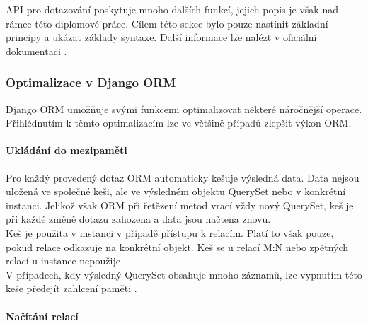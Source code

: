 \documentclass[ing,male,java,dept456]{diploma}						%
\begin{document}
API pro dotazování poskytuje mnoho dalších funkcí, jejich popis je však nad rámec této diplomové práce. Cílem této sekce bylo pouze nastínit základní principy a ukázat základy syntaxe. Další informace lze nalézt v oficiální dokumentaci \cite{djangodoc}.

\subsubsection{Optimalizace v Django ORM}

Django ORM umožňuje svými funkcemi optimalizovat některé náročnější operace. Přihlédnutím k těmto optimalizacím lze ve většině případů zlepšit výkon ORM. 

\paragraph{Ukládání do mezipaměti}

Pro každý provedený dotaz ORM automaticky kešuje výsledná data. Data nejsou uložená ve společné keši, ale ve výsledném objektu QuerySet nebo v konkrétní instanci. Jelikož však ORM při řetězení metod vrací vždy nový QuerySet, keš je při každé změně dotazu zahozena a data jsou načtena znovu. \\
Keš je použita v instanci v případě přístupu k relacím. Platí to však pouze, pokud relace odkazuje na konkrétní objekt. Keš se u relací M:N nebo zpětných relací u instance nepoužije \cite{dj-qscache}. \\
V případech, kdy výsledný QuerySet obsahuje mnoho záznamů, lze vypnutím této keše předejít zahlcení paměti \cite{dj-iterator}.

\paragraph{Načítání relací} 
\end{document}
